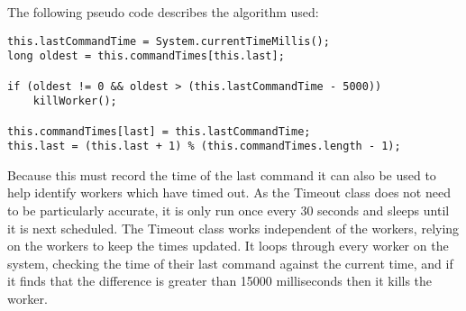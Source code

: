 The following pseudo code describes the algorithm used: %

\begin{verbatim}
this.lastCommandTime = System.currentTimeMillis();
long oldest = this.commandTimes[this.last];

if (oldest != 0 && oldest > (this.lastCommandTime - 5000))
    killWorker();

this.commandTimes[last] = this.lastCommandTime;
this.last = (this.last + 1) % (this.commandTimes.length - 1);
\end{verbatim}

Because this must record the time of the last command it can also be used to help identify workers which have timed out. As the Timeout class does not need to be particularly accurate, it is only run once every 30 seconds and sleeps until it is next scheduled. The Timeout class works independent of the workers, relying on the workers to keep the times updated. It loops through every worker on the system, checking the time of their last command against the current time, and if it finds that the difference is greater than 15000 milliseconds then it kills the worker.

